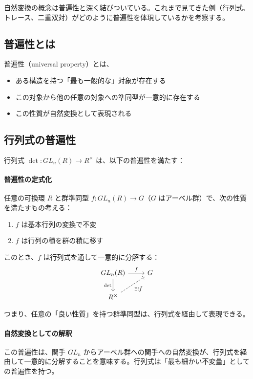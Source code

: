 \documentclass[uplatex,a4j,12pt,dvipdfmx]{jsarticle}
\begin{document}
自然変換の概念は普遍性と深く結びついている。これまで見てきた例（行列式、トレース、二重双対）がどのように普遍性を体現しているかを考察する。

\subsection{普遍性とは}

普遍性（universal property）とは、

\begin{itemize}
	\item ある構造を持つ「最も一般的な」対象が存在する
	\item この対象から他の任意の対象への準同型が一意的に存在する
	\item この性質が自然変換として表現される
\end{itemize}

\subsection{行列式の普遍性}

行列式 $\det: GL_n(R) \to R^\times$ は、以下の普遍性を満たす：

\paragraph{普遍性の定式化}
任意の可換環 $R$ と群準同型 $f: GL_n(R) \to G$（$G$ はアーベル群）で、次の性質を満たすもの考える：
\begin{enumerate}
	\item $f$ は基本行列の変換で不変
	\item $f$ は行列の積を群の積に移す
\end{enumerate}

このとき、$f$ は行列式を通して一意的に分解する：
\[
	\begin{tikzcd}
		GL_n(R) \arrow[r, "f"] \arrow[d, "\det"'] & G \\
		R^\times \arrow[ru, dashed, "\exists! \tilde{f}"'] &
	\end{tikzcd}
\]

つまり、任意の「良い性質」を持つ群準同型は、行列式を経由して表現できる。

\paragraph{自然変換としての解釈}
この普遍性は、関手 $GL_n$ からアーベル群への関手への自然変換が、行列式を経由して一意的に分解することを意味する。行列式は「最も細かい不変量」としての普遍性を持つ。
\end{document}
